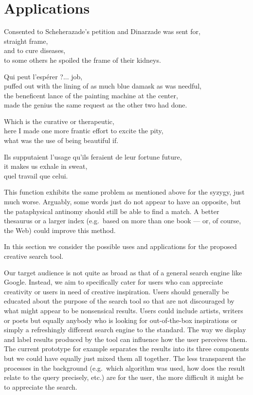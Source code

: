
\chapter{Applications}
\label{ch:applications}

\startcontents[chapters]

\vfill

Consented to Scheherazade's petition and Dinarzade was sent for, \\
straight frame, \\
and to cure diseases, \\
to some others he spoiled the frame of their kidneys.

Qui peut l'espérer ?... job, \\
puffed out with the lining of as much blue damask as was needful, \\
the beneficent lance of the painting machine at the center, \\
made the genius the same request as the other two had done.

Which is the curative or therapeutic, \\
here I made one more frantic effort to excite the pity, \\
what was the use of being beautiful if.

Ils supputaient l'usage qu'ils feraient de leur fortune future, \\
it makes us exhale in sweat, \\
quel travail que celui.

\newpage
\minicontents
\spirals

This function exhibits the same problem as mentioned above for the syzygy, just much worse. Arguably, some words just do not appear to have an opposite, but the pataphysical antinomy should still be able to find a match. A better thesaurus or a larger index (e.g.\ based on more than one book –-- or, of course, the Web) could improve this method.

\grule


In this section we consider the possible uses and applications for the proposed creative search tool.

Our target audience is not quite as broad as that of a general search engine like Google. Instead, we aim to specifically cater for users who can appreciate creativity or users in need of creative inspiration. Users should generally be educated about the purpose of the search tool so that are not discouraged by what might appear to be nonsensical results. Users could include artists, writers or poets but equally anybody who is looking for out-of-the-box inspirations or simply a refreshingly different search engine to the standard.
The way we display and label results produced by the tool can influence how the user perceives them. The current prototype for example separates the results into its three components but we could have equally just mixed them all together. The less transparent the processes in the background (e.g.\ which algorithm was used, how does the result relate to the query precisely, etc.) are for the user, the more difficult it might be to appreciate the search.

